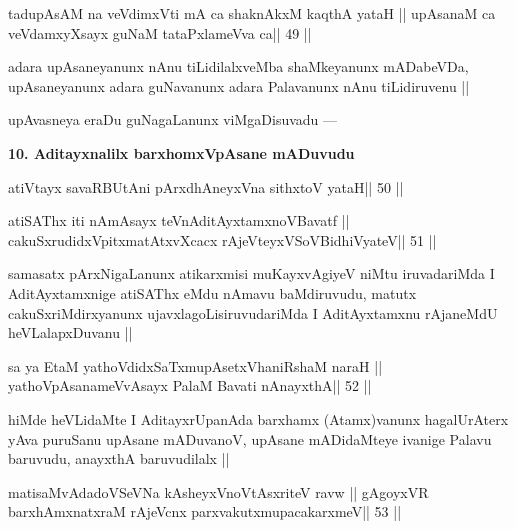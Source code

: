 \begin{shl}
tadupAsAM na veVdimxVti mA ca shaknAkxM kaqthA yataH ||
upAsanaM ca veVdamxyXsayx guNaM tataPxlameVva ca\hfill || 49 ||
\end{shl}

\begin{artha}
adara upAsaneyanunx nAnu tiLidilalxveMba shaMkeyanunx mADabeVDa, upAsaneyanunx adara guNavanunx adara Palavanunx nAnu tiLidiruvenu ||
\end{artha}

\begin{artha}
upAvasneya eraDu guNagaLanunx viMgaDisuvadu ---
\end{artha}


\begin{artha}
{\bf 10. Aditayxnalilx barxhomxVpAsane mADuvudu}
\end{artha} 

\begin{shl}
atiVtayx savaRBUtAni pArxdhAneyxVna sithxtoV yataH\hfill || 50 ||
\end{shl}

\begin{shl}
atiSAThx iti nAmAsayx teVnA\s\s ditAyxtamxnoV\s Bavatf ||
cakuSxrudidxVpitxmatAtxvXcacx rAjeVteyxVSoV\s BidhiVyateV\hfill || 51 ||
\end{shl}

\begin{artha}
samasatx pArxNigaLanunx atikarxmisi muKayxvAgiyeV niMtu iruvadariMda I AditAyxtamxnige atiSAThx eMdu nAmavu baMdiruvudu, matutx cakuSxriMdirxyanunx ujavxlagoLisiruvudariMda I AditAyxtamxnu rAjaneMdU heVLalapxDuvanu ||
\end{artha}

\begin{shl}
sa ya EtaM yathoVdidxSaTxmupAsetxV\s haniRshaM naraH ||
yathoVpAsanameVvAsayx PalaM Bavati nAnayxthA\hfill || 52 ||
\end{shl}

\begin{artha}
hiMde heVLidaMte I AditayxrUpanAda barxhamx (Atamx)vanunx hagalUrAterx yAva puruSanu upAsane mADuvanoV, upAsane mADidaMteye ivanige Palavu baruvudu, anayxthA baruvudilalx ||
\end{artha}

\begin{shl}
matisaMvAdadoVSeVNa kAsheyxVnoVtAsxriteV ravw ||
gAgoyxVR barxhAmxnatxraM rAjeVcnx parxvakutxmupacakarxmeV\hfill || 53 ||
\end{shl}

